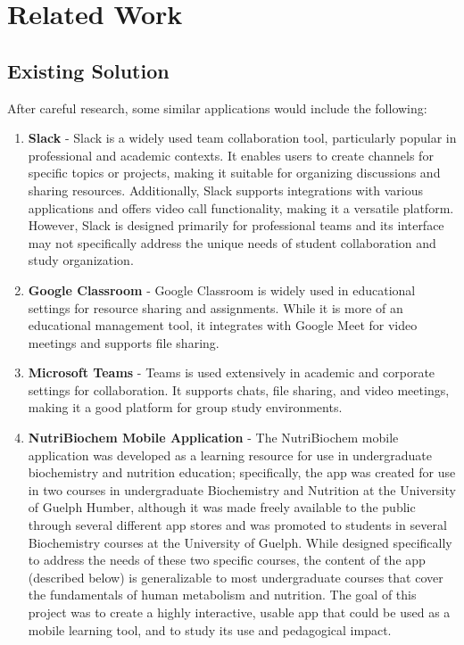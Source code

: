 
\chapter{Related Work}\label{chapter:chap2}



\section{Existing Solution}

After careful research, some similar applications would include the following:
\begin{enumerate}
    \item \textbf{Slack}\cite{Slack} - Slack is a widely used team collaboration tool, particularly popular in professional and academic contexts. It enables users to create channels for specific topics or projects, making it suitable for organizing discussions and sharing resources. Additionally, Slack supports integrations with various applications and offers video call functionality, making it a versatile platform. However, Slack is designed primarily for professional teams and its interface may not specifically address the unique needs of student collaboration and study organization.
    \item \textbf{Google Classroom}\cite{Classroom} - Google Classroom is widely used in educational settings for resource sharing and assignments. While it is more of an educational management tool, it integrates with Google Meet for video meetings and supports file sharing.
    \item \textbf{Microsoft Teams}\cite{Teams} - Teams is used extensively in academic and corporate settings for collaboration. It supports chats, file sharing, and video meetings, making it a good platform for group study environments.
    \item \textbf{NutriBiochem Mobile Application}\cite{NutriBiochem} - The NutriBiochem mobile application was developed as a learning resource for use in undergraduate biochemistry and nutrition education; specifically, the app was created for use in two courses in undergraduate Biochemistry and Nutrition at the University of Guelph Humber, although it was made freely available to the public through several different app stores and was promoted to students in several Biochemistry courses at the University of Guelph. While designed specifically to address the needs of these two specific courses, the content of the app (described below) is generalizable to most undergraduate courses that cover the fundamentals of human metabolism and nutrition. The goal of this project was to create a highly interactive, usable app that could be used as a mobile learning tool, and to study its use and pedagogical impact.
\end{enumerate}

